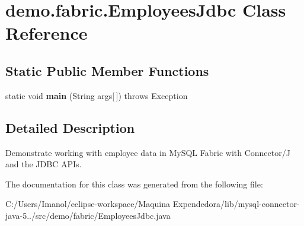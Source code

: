 \hypertarget{classdemo_1_1fabric_1_1_employees_jdbc}{}\section{demo.\+fabric.\+Employees\+Jdbc Class Reference}
\label{classdemo_1_1fabric_1_1_employees_jdbc}
\subsection*{Static Public Member Functions}
\begin{DoxyCompactItemize}
\item 
\mbox{\label{classdemo_1_1fabric_1_1_employees_jdbc_adc388567ac3784120c059a667a4f694d}} 
static void {\bfseries main} (String args\mbox{[}$\,$\mbox{]})  throws Exception 
\end{DoxyCompactItemize}


\subsection{Detailed Description}
Demonstrate working with employee data in My\+S\+QL Fabric with Connector/J and the J\+D\+BC A\+P\+Is. 

The documentation for this class was generated from the following file\+:\begin{DoxyCompactItemize}
\item 
C\+:/\+Users/\+Imanol/eclipse-\/workspace/\+Maquina Expendedora/lib/mysql-\/connector-\/java-\/5../src/demo/fabric/Employees\+Jdbc.\+java\end{DoxyCompactItemize}
